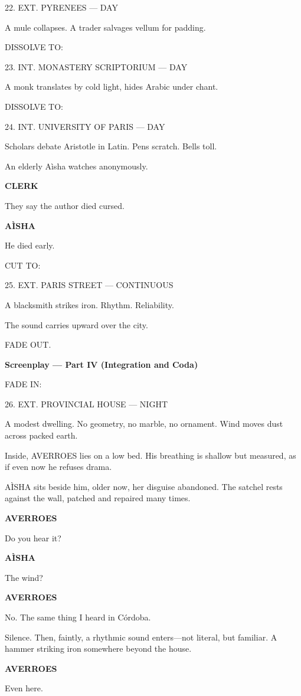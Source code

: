\documentclass[12pt]{article}
\newlength{\charindent}
\newlength{\dialogueindent}
\newlength{\dialoguewidth}
\newlength{\transitionindent}
\newcommand{\sectionhead}[1]{\vspace{1em}\textbf{#1}\vspace{0.25em}}
\newcommand{\slug}[1]{\vspace{1.25em}\textsc{#1}\vspace{0.5em}}
\newcommand{\action}[1]{#1}
\newcommand{\character}[1]{%
  \par\vspace{0.75em}%
  \hspace*{\charindent}\textbf{#1}%
}
\newcommand{\dialogue}[1]{%
  \par\nobreak
  \hspace*{\dialogueindent}%
  \begin{minipage}[t]{\dialoguewidth}
  #1
  \end{minipage}
}
\newcommand{\transition}[1]{%
  \par\vspace{1em}%
  \hspace*{\transitionindent}\textsc{#1}%
}
\begin{document}
\slug{22. EXT. PYRENEES --- DAY}

\action{A mule collapses. A trader salvages vellum for padding.}

\transition{DISSOLVE TO:}

\slug{23. INT. MONASTERY SCRIPTORIUM --- DAY}

\action{A monk translates by cold light, hides Arabic under chant.}

\transition{DISSOLVE TO:}

\slug{24. INT. UNIVERSITY OF PARIS --- DAY}

\action{Scholars debate Aristotle in Latin. Pens scratch. Bells toll.}

\action{An elderly A\`isha watches anonymously.}

\character{CLERK}
\dialogue{They say the author died cursed.}

\character{A\`ISHA}
\dialogue{He died early.}

\transition{CUT TO:}

\slug{25. EXT. PARIS STREET --- CONTINUOUS}

\action{A blacksmith strikes iron. Rhythm. Reliability.}

\action{The sound carries upward over the city.}

\transition{FADE OUT.}

\sectionhead{Screenplay — Part IV (Integration and Coda)}

\slug{FADE IN:}

\slug{26. EXT. PROVINCIAL HOUSE --- NIGHT}

\action{A modest dwelling. No geometry, no marble, no ornament. Wind moves dust across packed earth.}

\action{Inside, AVERROES lies on a low bed. His breathing is shallow but measured, as if even now he refuses drama.}

\action{A\`ISHA sits beside him, older now, her disguise abandoned. The satchel rests against the wall, patched and repaired many times.}

\character{AVERROES}
\dialogue{Do you hear it?}

\character{A\`ISHA}
\dialogue{The wind?}

\character{AVERROES}
\dialogue{No. The same thing I heard in Córdoba.}

\action{Silence. Then, faintly, a rhythmic sound enters—not literal, but familiar. A hammer striking iron somewhere beyond the house.}

\character{AVERROES}
\dialogue{Even here.}
\end{document}
